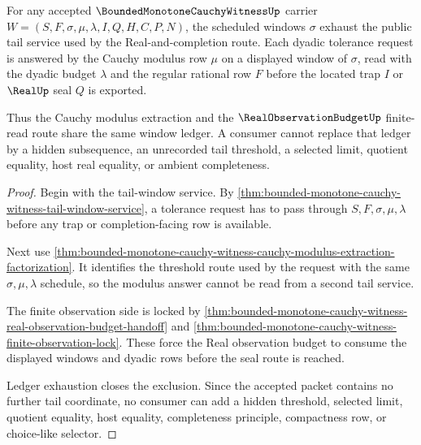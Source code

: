\begin{theorem}
\label{thm:bounded-monotone-cauchy-witness-window-exhaustion}
For any accepted $\BoundedMonotoneCauchyWitnessUp$ carrier $W=(S,F,\sigma,\mu,\lambda,I,Q,H,C,P,N)$, the scheduled windows $\sigma$ exhaust the public tail service used by the Real-and-completion route. Each dyadic tolerance request is answered by the Cauchy modulus row $\mu$ on a displayed window of $\sigma$, read with the dyadic budget $\lambda$ and the regular rational row $F$ before the located trap $I$ or $\RealUp$ seal $Q$ is exported.

Thus the Cauchy modulus extraction and the $\RealObservationBudgetUp$ finite-read route share the same window ledger. A consumer cannot replace that ledger by a hidden subsequence, an unrecorded tail threshold, a selected limit, quotient equality, host real equality, or ambient completeness.
\end{theorem}
\begin{proof}
Begin with the tail-window service. By \autoref{thm:bounded-monotone-cauchy-witness-tail-window-service}, a tolerance request has to pass through $S,F,\sigma,\mu,\lambda$ before any trap or completion-facing row is available.

Next use \autoref{thm:bounded-monotone-cauchy-witness-cauchy-modulus-extraction-factorization}. It identifies the threshold route used by the request with the same $\sigma,\mu,\lambda$ schedule, so the modulus answer cannot be read from a second tail service.

The finite observation side is locked by \autoref{thm:bounded-monotone-cauchy-witness-real-observation-budget-handoff} and \autoref{thm:bounded-monotone-cauchy-witness-finite-observation-lock}. These force the Real observation budget to consume the displayed windows and dyadic rows before the seal route is reached.

Ledger exhaustion closes the exclusion. Since the accepted packet contains no further tail coordinate, no consumer can add a hidden threshold, selected limit, quotient equality, host equality, completeness principle, compactness row, or choice-like selector.
\end{proof}

